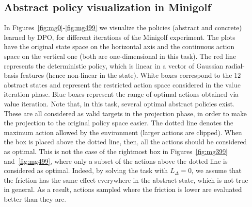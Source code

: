 \subsection{Abstract policy visualization in Minigolf}
In Figures~\ref{fig:mg0}-\ref{fig:mg499} we visualize the policies (abstract and concrete) learned by DPO, for different iterations of the Minigolf experiment. The plots have the original state space on the horizontal axis and the continuous action space on the vertical one (both are one-dimensional in this task). The red line represents the deterministic policy, which is linear in a vector of Gaussian radial-basis features (hence non-linear in the state). White boxes correspond to the $12$ abstract states and represent the restricted action space considered in the value iteration phase. Blue boxes represent the range of optimal actions obtained via value iteration. Note that, in this task, several optimal abstract policies exist. These are all considered as valid targets in the projection phase, in order to make the projection to the original policy space easier. The dotted line denotes the maximum action allowed by the environment (larger actions are clipped). When the box is placed above the dotted line, then, all the actions should be considered as optimal. This is not the case of the rightmost box in Figures~\ref{fig:mg399} and~\ref{fig:mg499}, where only a subset of the actions above the dotted line is considered as optimal. Indeed, by solving the task with $L_{\Delta}=0$, we assume that the friction has the same effect everywhere in the abstract state, which is not true in general. As a result, actions sampled where the friction is lower are evaluated better than they are.



